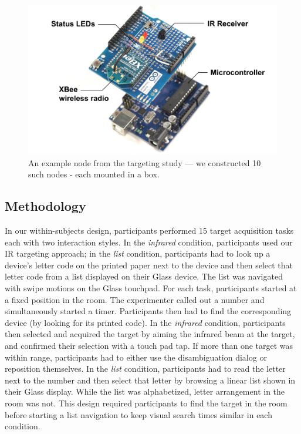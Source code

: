 \begin{figure}[b]
\centering
\includegraphics[width=0.8\columnwidth]{figures/study-node.pdf}
\caption{An example node from the targeting study --- we constructed 10 such nodes - each mounted in a box.}
\label{fig:targeting-study-layout}
\end{figure}

\subsection{Methodology}
In our within-subjects design, participants performed 15 target acquisition tasks each with two interaction styles. In the {\em infrared} condition, participants used our IR targeting approach; in the {\em list} condition, participants had to look up a device's letter code on the printed paper next to the device and then select that letter code from a list displayed on their Glass device. The list was navigated with swipe motions on the Glass touchpad. For each task, participants started at a fixed position in the room. The experimenter called out a number and simultaneously started a timer. Participants then had to find the corresponding device (by looking for its printed code). In the {\em infrared} condition, participants then selected and acquired the target by aiming the infrared beam at the target, and confirmed their selection with a touch pad tap. If more than one target was within range, participants had to either use the disambiguation dialog or reposition themselves. In the {\em list} condition, participants had to read the letter next to the number and then select that letter by browsing a linear list shown in their Glass display. While the list was alphabetized, letter arrangement in the room was not. This design required participants to find the target in the room before starting a list navigation to keep visual search times similar in each condition.

